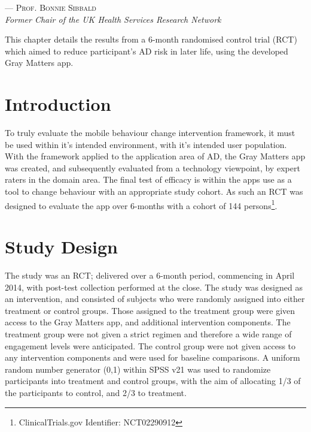  \label{chapter: prevention-rctresults}

\setlength{\epigraphwidth}{.50\textwidth}
\begin{epigraphs}
{--- \textsc{Prof. Bonnie Sibbald} \\ \textit{Former Chair of the UK Health Services Research Network}}
\end{epigraphs}

This chapter details the results from a 6-month randomised control trial (RCT) which aimed to reduce participant's AD risk in later life, using the developed Gray Matters app.

\section{Introduction}
To truly evaluate the mobile behaviour change intervention framework, it must be used within it's intended environment, with it's intended user population. With the framework applied to the application area of AD, the Gray Matters app was created, and subsequently evaluated from a technology viewpoint, by expert raters in the domain area. The final test of efficacy is within the apps use as a tool to change behaviour with an appropriate study cohort. As such an RCT was designed to evaluate the app over 6-months with a cohort of 144 persons\footnote{ClinicalTrials.gov Identifier: NCT02290912}.

\section{Study Design}
The study was an RCT; delivered over a 6-month period, commencing in April 2014, with post-test collection performed at the close.
The study was designed as an intervention, and consisted of subjects who were randomly assigned into either treatment or control groups. Those assigned to the treatment group were given access to the Gray Matters app, and additional intervention components. The treatment group were not given a strict regimen and therefore a wide range of engagement levels were anticipated. The control group were not given access to any intervention components and were used for baseline comparisons. A uniform random number generator (0,1) within SPSS v21 was used to randomize participants into treatment and control groups, with the aim of allocating 1/3 of the participants to control, and 2/3 to treatment.


